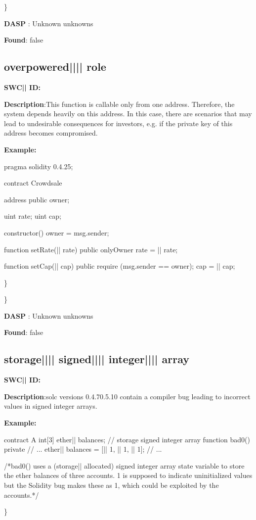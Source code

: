 \documentclass{article}
\begin{document}
\} 

\textbf{DASP} : Unknown unknowns

\textbf{Found}: false

\subsection{overpowered{||\textunderscore|| }role} 
\textbf{SWC{|\textunderscore| }ID:} 

\textbf{Description}:This function is callable only from one address. Therefore, the system depends heavily on this address. In this case, there are scenarios that may lead to undesirable consequences for investors, e.g. if the private key of this address becomes compromised.


\textbf{Example:} 
\begin{ffcode} 

pragma solidity 0.4.25;

contract Crowdsale {

    address public owner;

    uint rate;
    uint cap;

    constructor() {
        owner = msg.sender;
    }

    function setRate(|\textunderscore| rate) public onlyOwner {
        rate = |\textunderscore| rate;
    }

    function setCap(|\textunderscore| cap) public {
        require (msg.sender == owner);
        cap = |\textunderscore| cap;
    }
}

\end{ffcode} 
\} 

\} 

\textbf{DASP} : Unknown unknowns

\textbf{Found}: false

\subsection{storage{||\textunderscore|| }signed{||\textunderscore|| }integer{||\textunderscore|| }array} 
\textbf{SWC{|\textunderscore| }ID:} 

\textbf{Description}:solc versions 0.4.7{\textendash}0.5.10 contain a compiler bug leading to incorrect values in signed integer arrays.


\textbf{Example:} 
\begin{ffcode} 

contract A {
  int[3] ether|\textunderscore| balances; // storage signed integer array
  function bad0() private {
    // ...
    ether|\textunderscore| balances = [|\textendash| 1, |\textendash| 1, |\textendash| 1];
    // ...
  }
}

 /*bad0() uses a (storage|\textendash| allocated) signed integer array state variable to store the ether balances of three accounts. 1 is supposed to indicate uninitialized values but the Solidity bug makes these as 1, which could be exploited by the accounts.*/ 

\end{ffcode} 
\} 
\end{document}
